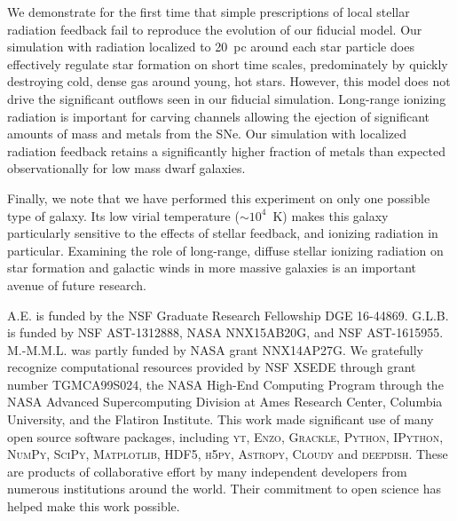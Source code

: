 \documentclass[twocolumn]{aastex62}
\begin{document}
We demonstrate for the first time that simple prescriptions of local stellar radiation feedback fail to reproduce the evolution of our fiducial model. Our simulation with radiation localized to 20~pc around each star particle does effectively regulate star formation on short time scales, predominately by quickly destroying cold, dense gas around young, hot stars. However, this model does not drive the significant outflows seen in our fiducial simulation. Long-range ionizing radiation is important for carving channels allowing the ejection of significant amounts of mass and metals from the SNe. Our simulation with localized radiation feedback retains a significantly higher fraction of metals than expected observationally for low mass dwarf galaxies.  

Finally, we note that we have performed this experiment on only one possible type of galaxy. Its low virial temperature ($\sim10^{4}$~K) makes this galaxy particularly sensitive to the effects of stellar feedback, and ionizing radiation in particular. Examining the role of long-range, diffuse stellar ionizing radiation on star formation and galactic winds in more massive galaxies is an important avenue of future research. 

\acknowledgments
A.E. is funded by the NSF Graduate Research Fellowship DGE 16-44869. G.L.B. is funded by NSF AST-1312888, NASA NNX15AB20G, and NSF AST-1615955. M.-M.M.L. was partly funded by NASA  grant NNX14AP27G. We gratefully recognize computational resources provided by NSF XSEDE through grant number TGMCA99S024, the NASA High-End Computing Program through the NASA Advanced Supercomputing Division at Ames Research Center, Columbia University, and the Flatiron Institute. This work made significant use of many open source software packages, including \textsc{yt}, \textsc{Enzo}, \textsc{Grackle}, \textsc{Python}, \textsc{IPython}, \textsc{NumPy}, \textsc{SciPy}, \textsc{Matplotlib}, \textsc{HDF5}, \textsc{h5py}, \textsc{Astropy}, \textsc{Cloudy} and \textsc{deepdish}. These are products of collaborative effort by many independent developers from numerous institutions around the world. Their commitment to open science has helped make this work possible. 

 
\end{document}

